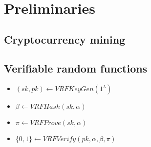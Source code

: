 \section{Preliminaries}

\subsection{Cryptocurrency mining}




\subsection{Verifiable random functions}




\begin{itemize}
    \item $(sk, pk) \leftarrow VRFKeyGen(1^{\lambda})$
    \item $\beta \leftarrow VRFHash(sk, \alpha)$
    \item $\pi \leftarrow VRFProve(sk, \alpha)$
    \item $\{0, 1\} \leftarrow VRFVerify(pk, \alpha, \beta, \pi)$
\end{itemize}